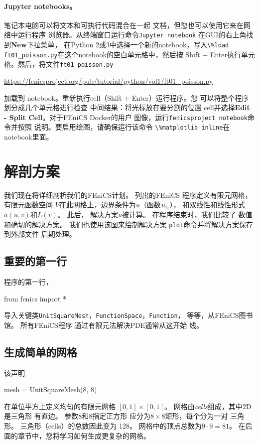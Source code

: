 \paragraph{Jupyter notebooks。}

笔记本电脑可以将文本和可执行代码混合在一起
文档，但您也可以使用它来在网络中运行程序
浏览器。从终端窗口运行命令\texttt{Jupyter notebook}
在GUI的右上角找到\textbf{New}下拉菜单，
在Python 2或3中选择一个新的notebook，写入\verb!\%load ft01_poisson.py!在这个notebook的空白单元格中，然后按
Shift + Enter执行单元格。然后，将文件\nolinkurl{ft01_poisson.py}
\begin{center}
  \url{https://fenicsproject.org/pub/tutorial/python/vol1/ft01_poisson.py}
\end{center}
加载到
notebook。重新执行cell（Shift + Enter）运行程序。您
可以将整个程序划分成几个单元格进行检查
中间结果：将光标放在要分割的位置
cell并选择\textbf{Edit - Split Cell}。对于FEniCS Docker的用户
图像，运行\texttt{fenicsproject notebook}命令并按照
说明。要启用绘图，请确保运行该命令
\verb!\%matplotlib inline!在notebook里面。

\section{解剖方案}
\label{ch:poisson0:impl:dissect}
我们现在将详细剖析我们的FEniCS计划。 列出的FEniCS
程序定义有限元网格，有限元函数空间
$V$在此网格上，边界条件为$u$（函数$\ub$），
和双线性和线性形式$a(u,v)$和$L(v)$。 此后，
解决方案$u$被计算。 在程序结束时，我们比较了
数值和确切的解决方案。 我们也使用该图来绘制解决方案
\texttt{plot}命令并将解决方案保存到外部文件
后期处理。

\subsection{重要的第一行}
程序的第一行，
\begin{python}
from fenics import *
\end{python}
导入关键类\texttt{UnitSquareMesh}，\texttt{FunctionSpace}，\texttt{Function}，
等等，从FEniCS图书馆。 所有FEniCS程序
通过有限元法解决PDE通常从这开始
线。


\subsection{生成简单的网格}
该声明
\begin{python}
mesh = UnitSquareMesh(8, 8)
\end{python}
在单位平方上定义均匀的有限元网格
$[0,1]\times [0,1]$。 网格由\emph{cells}组成，其中2D是三角形
有直边。 参数8和8指定正方形
应分为$8\times 8$矩形，每个分为一对
三角形。 三角形（cells）的总数因此变为
128。 网格中的顶点总数为$9\cdot 9=81$。
在后面的章节中，您将学习如何生成更复杂的网格。

